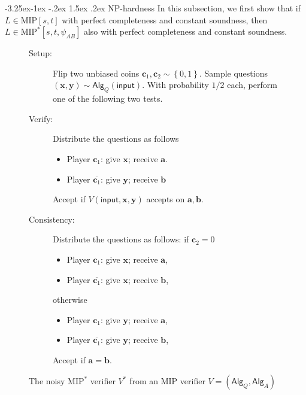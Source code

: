 \documentclass[11pt]{article}
\makeatletter
\renewcommand{\subsection}{\@startsection{subsection}{2}{\z@}%
             {-3.25ex\@plus -1ex \@minus -.2ex}%
             {1.5ex \@plus .2ex}%
             {\normalfont\large\scshape\bfseries}}
\theoremstyle{plain}
\theoremstyle{definition}
\newcommand {\set} [1] {\ensuremath{ \left\lbrace #1 \right\rbrace }}
\newenvironment{Algorithm}{\begin{framed}}{\end{framed}}
\newcommand{\1}{\mathbb{1}} %
\newcommand{\ba}{\pmb{a}}
\newcommand{\bb}{\pmb{b}}
\newcommand{\bc}{\pmb{c}}
\newcommand{\bx}{\pmb{x}}
\newcommand{\by}{\pmb{y}}
\newcommand{\ipt}{\mathsf{input}}
\newcommand{\Alg}{\mathsf{Alg}}
\newcommand{\MIP}{\mathrm{MIP}}
\makeatother
\begin{document}
\subsection{NP-hardness}
\label{sec:np-hard}
In this subsection, we first show that if $L \in \MIP[s,t]$ with perfect completeness and constant soundness, then $L \in \MIP^*[s,t,\psi_{AB}]$ also with perfect completeness and constant soundness.

\begin{figure}
 \begin{Algorithm}
    \begin{description}
    	\item[Setup:] Flip two unbiased coins $\bc_1, \bc_2 \sim \set{0,1}$. 
             Sample questions $(\bx,\by) \sim \Alg_Q(\ipt)$.
             With probability $1/2$ each, perform one of the following two tests.
             \item[Verify:] Distribute the questions as follows
             \begin{itemize}
                 \item Player $\bc_1$: give $\bx$; receive $\ba$.
    		\item Player $\overline{\bc_1}$: give $\by$; receive $\bb$
    		\end{itemize}
    		Accept if $V(\ipt, \bx, \by)$ accepts on $\ba, \bb$.
            \item[Consistency:] Distribute the questions as follows:
                if $\bc_2 = 0$
                \begin{itemize}
                 \item Player $\bc_1$: give $\bx$; receive $\ba$,
    		      \item Player $\overline{\bc_1}$: give $\bx$; receive $\bb$,
                \end{itemize}
                otherwise 
                \begin{itemize}
                 \item Player $\bc_1$: give $\by$; receive $\ba$,
    		      \item Player $\overline{\bc_1}$: give $\by$; receive $\bb$,
    		\end{itemize}
    		Accept if $\ba = \bb$.
    \end{description}
    \end{Algorithm}
    \caption{The noisy $\MIP^*$ verifier $V^*$ from an $\MIP$ verifier $V = (\Alg_Q,\Alg_A)$}\label{fig:verifier}
    \end{figure}
\end{document}
